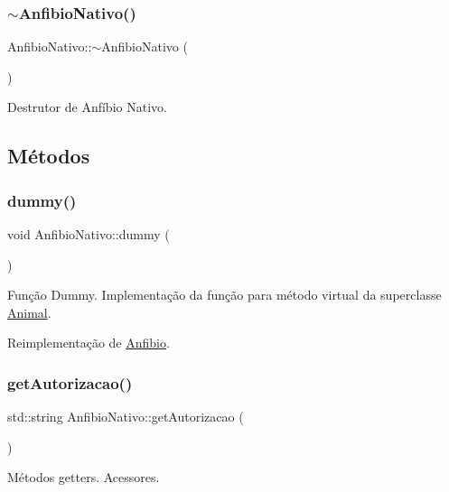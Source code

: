 \subsubsection{\texorpdfstring{$\sim$\+Anfibio\+Nativo()}{~AnfibioNativo()}}
{\footnotesize\ttfamily Anfibio\+Nativo\+::$\sim$\+Anfibio\+Nativo (\begin{DoxyParamCaption}{ }\end{DoxyParamCaption})}

Destrutor de Anfíbio Nativo. 

\subsection{Métodos}
\mbox{\label{classAnfibioNativo_ace45796a9ce43d12b992182643aeb94e}} 
\subsubsection{\texorpdfstring{dummy()}{dummy()}}
{\footnotesize\ttfamily void Anfibio\+Nativo\+::dummy (\begin{DoxyParamCaption}{ }\end{DoxyParamCaption})\hspace{0.3cm}{\ttfamily [virtual]}}

Função Dummy. Implementação da função para método virtual da superclasse \hyperlink{classAnimal}{Animal}. 

Reimplementação de \hyperlink{classAnfibio_a5f92eac4e6add9b2798119cc38dda093}{Anfibio}.

\mbox{\label{classAnfibioNativo_ac49d89e944f29ee3584741382b6378d8}} 
\subsubsection{\texorpdfstring{get\+Autorizacao()}{getAutorizacao()}}
{\footnotesize\ttfamily std\+::string Anfibio\+Nativo\+::get\+Autorizacao (\begin{DoxyParamCaption}{ }\end{DoxyParamCaption})}

Métodos getters. Acessores. \mbox{\label{classAnfibioNativo_abe331a3871d097e8f272da09d81ca629}} 
